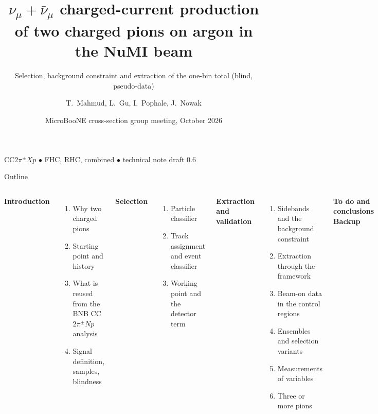 \documentclass[aspectratio=169,10pt]{beamer}
\title[CC$2\pi^{\pm}$ in NuMI]{$\nu_\mu+\bar\nu_\mu$ charged-current production of two charged pions on argon in the NuMI beam}
\subtitle{Selection, background constraint and extraction of the one-bin total (blind, pseudo-data)}
\author[Nowak et al.]{T.~Mahmud, L.~Gu, I.~Pophale, J.~Nowak}
\institute{Lancaster University}
\date{MicroBooNE cross-section group meeting, October 2026}
\begin{document}
{
\begin{frame}[plain]
  \titlepage
  \begin{center}\small\color{ubdark}
  CC$2\pi^\pm Xp$ \;$\bullet$\; FHC, RHC, combined \;$\bullet$\; technical note draft 0.6
  \end{center}
\end{frame}}

\begin{frame}{Outline}
  \begin{columns}[T]
  \textbf{\color{ubred}Introduction}
  \begin{enumerate}\small
    \item Why two charged pions
    \item Starting point and history
    \item What is reused from the BNB CC$2\pi^\pm Np$ analysis
    \item Signal definition, samples, blindness
  \end{enumerate}
  \vspace{2mm}
  \textbf{\color{ubred}Selection}
  \begin{enumerate}\small\setcounter{enumi}{4}
    \item Particle classifier
    \item Track assignment and event classifier
    \item Working point and the detector term
  \end{enumerate}
  \textbf{\color{ubred}Extraction and validation}
  \begin{enumerate}\small\setcounter{enumi}{7}
    \item Sidebands and the background constraint
    \item Extraction through the framework
    \item Beam-on data in the control regions
    \item Ensembles and selection variants
    \item Measurements of variables
    \item Three or more pions
  \end{enumerate}
  \vspace{2mm}
  \textbf{\color{ubred}To do and conclusions}\\[1mm]
  \textbf{\color{ubred}Backup}
  \end{columns}
\end{frame}

\end{document}
